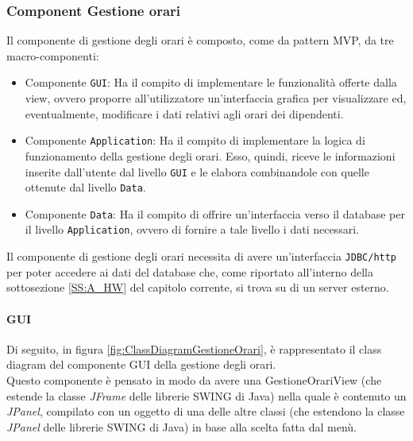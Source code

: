 \subsubsection{Component Gestione orari}
Il componente di gestione degli orari è composto, come da pattern MVP, da tre macro-componenti:
\begin{itemize}
	\item Componente \verb|GUI|: Ha il compito di implementare le funzionalità offerte dalla view, ovvero proporre all'utilizzatore un'interfaccia grafica per visualizzare ed, eventualmente, modificare i dati relativi agli orari dei dipendenti.
	\item Componente \verb|Application|: Ha il compito di implementare la logica di funzionamento della gestione degli orari. Esso, quindi, riceve le informazioni inserite dall'utente dal livello \verb|GUI| e le elabora combinandole con quelle ottenute dal livello \verb|Data|.
	\item Componente \verb|Data|: Ha il compito di offrire un'interfaccia verso il database per il livello \verb|Application|, ovvero di fornire a tale livello i dati necessari.
\end{itemize}
Il componente di gestione degli orari necessita di avere un'interfaccia \verb|JDBC/http| per poter accedere ai dati del database che, come riportato all'interno della sottosezione \ref{SS:A_HW} del capitolo corrente, si trova su di un server esterno.
\paragraph{GUI}
Di seguito, in figura \ref{fig:ClassDiagramGestioneOrari}, è rappresentato il class diagram del componente GUI della gestione degli orari.\\
Questo componente è pensato in modo da avere una GestioneOrariView (che estende la classe \textit{JFrame} delle librerie SWING di Java) nella quale è contenuto un \textit{JPanel}, compilato con un oggetto di una delle altre classi (che estendono la classe \textit{JPanel} delle librerie SWING di Java) in base alla scelta fatta dal menù.
